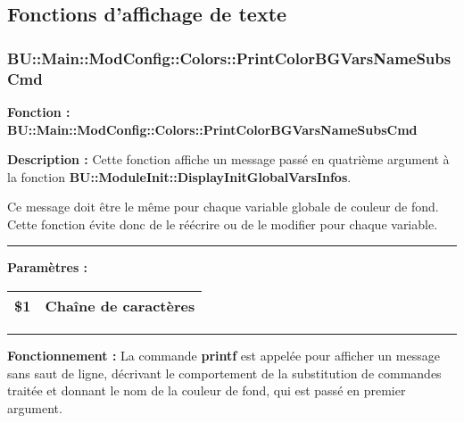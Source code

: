 \documentclass[a4paper,10pt]{article}
\begin{document}
\color{sec2}
\subsection{Fonctions d'affichage de texte}\color{text}

\color{sec3}
\subsubsection{BU::Main::ModConfig::Colors::PrintColorBGVarsNameSubsCmd}\color{text}

\begin{justify}
    \textbf{Fonction : \color{func}BU::Main::ModConfig::Colors::PrintColorBGVarsNameSubsCmd}
\end{justify}

\begin{justify}
    \textbf{Description :} Cette fonction affiche un message passé en quatrième argument à la fonction \textbf{\color{func}BU::ModuleInit::DisplayInitGlobalVarsInfos}.
\end{justify}

\begin{justify}
    Ce message doit être le même pour chaque variable globale de couleur de fond. Cette fonction évite donc de le réécrire ou de le modifier pour chaque variable.
\end{justify}


\par\noindent\rule{\textwidth}{0.4pt}

\begin{justify}
    \textbf{Paramètres :}

    \begin{tabular}{|l|l|}
        \hline
        \textbf{\color{vars}\$1} & Chaîne de caractères\\
        \hline
    \end{tabular}
\end{justify}


\par\noindent\rule{\textwidth}{0.4pt}

\begin{justify}
    \textbf{Fonctionnement :} La commande \textbf{\color{cmds}printf} est appelée pour afficher un message sans saut de ligne, décrivant le comportement de la substitution de commandes traitée et donnant le nom de la couleur de fond, qui est passé en premier argument.
\end{justify}
\end{document}
